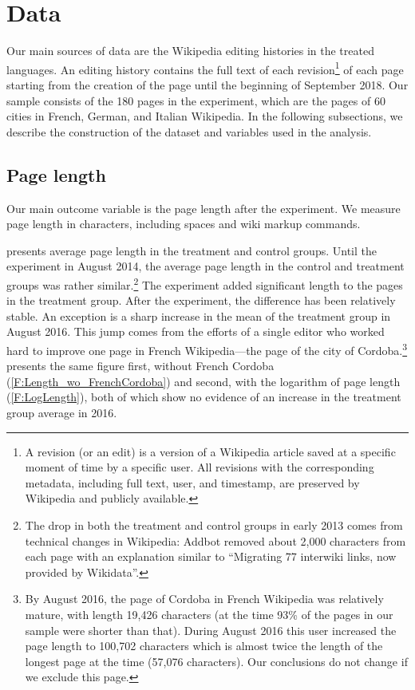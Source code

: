 \documentclass[12pt]{article}
\begin{document}
\section{Data} \label{S:Data}

Our main sources of data are the Wikipedia editing histories in the treated languages. An editing history contains the full text of each revision\footnote{A revision (or an edit) is a version of a Wikipedia article saved at a specific moment of time by a specific user. All revisions with the corresponding metadata, including full text, user, and timestamp, are preserved by Wikipedia and publicly available.} of each page starting from the creation of the page until the beginning of September 2018. Our sample consists of the 180 pages in the experiment, which are the pages of 60 cities in French, German, and Italian Wikipedia.
In the following subsections, we describe the construction of the dataset and variables used in the analysis.

\subsection{Page length}

Our main outcome variable is the page length after the experiment. We measure page length in characters, including spaces and wiki markup commands.

 presents average page length in the treatment and control groups. Until the experiment in August 2014, the average page length in the control and treatment groups was rather similar.\footnote{The drop in both the treatment and control groups in early 2013 comes from technical changes in Wikipedia: Addbot removed about 2,000 characters from each page with an explanation similar to ``Migrating 77 interwiki links, now provided by Wikidata''.}  The experiment added significant length to the pages in the treatment group. After the experiment, the difference has been relatively stable. An exception is a sharp increase in the mean of the treatment group in August 2016. This jump comes from the efforts of a single editor who worked hard to improve one page in French Wikipedia---the page of the city of Cordoba.\footnote{By August 2016, the page of Cordoba in French Wikipedia was relatively mature, with length 19,426 characters (at the time 93\% of the pages in our sample were shorter than that). During August 2016 this user increased the page length to 100,702 characters which is almost twice the length of the longest page at the time (57,076 characters). Our conclusions do not change if we exclude this page. }
 presents the same figure first, without French Cordoba (\cref{F:Length_wo_FrenchCordoba}) and second, with the logarithm of page length (\cref{F:LogLength}), both of which show no evidence of an increase in the treatment group average in 2016.
\end{document}
